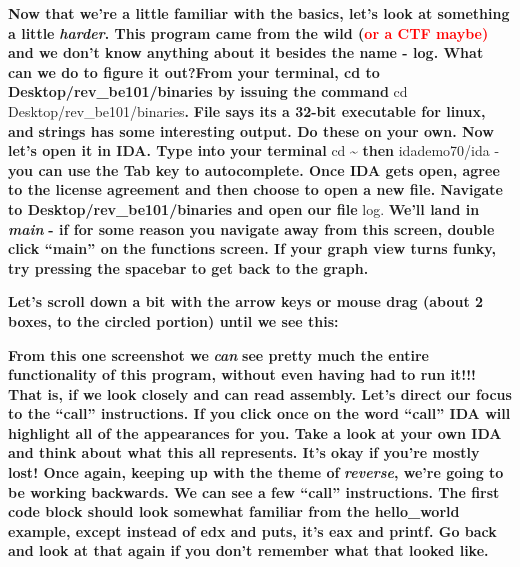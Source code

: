 \textbf{Now that we're a little familiar with the basics, let's look at something a little
}\textbf{\textit{harder}}\textbf{. This program came from the wild (}\textbf{\textcolor{red}{or a CTF maybe)}}\textbf{
and we don't know anything about it besides the name - log. What can we do to figure it out?From your terminal, cd to
Desktop/rev\_be101/binaries by issuing the command }cd Desktop/rev\_be101/binaries\textbf{.
}\textbf{\textcolor[rgb]{0.21960784,0.4627451,0.11372549}{File }}\textbf{says its a 32-bit executable for linux, and
}\textbf{\textcolor[rgb]{0.21960784,0.4627451,0.11372549}{strings }}\textbf{has some interesting output. Do these on
your own. \newline
\newline
Now let's open it in IDA. Type into your terminal }cd \~{} \textbf{then }idademo70/ida -\textbf{you can use the Tab key
to autocomplete. Once IDA gets open, agree to the license agreement and then choose to open a new file. Navigate to
Desktop/rev\_be101/binaries and open our file }log. \textbf{We'll land in }\textbf{\textit{main }}\textbf{ {}- if for
some reason you navigate away from this screen, double click ``main'' on the functions screen. If your graph view turns
funky, try pressing the spacebar to get back to the graph.}  
 

\textbf{Let's scroll down a bit with the arrow keys or mouse drag (about 2 boxes, to the circled portion) until we see
this:  }

  
 

\textbf{From this one screenshot we }\textbf{\textit{can}}\textbf{ see pretty much the entire functionality of this
program, without even having had to run it!!! That is, if we look closely and can read assembly. Let's direct our focus
to the ``call'' instructions. If you click once on the word ``call'' IDA will highlight all of the appearances for you.
Take a look at your own IDA and think about what this all represents. It's okay if you're mostly lost! Once again,
keeping up with the theme of }\textbf{\textit{reverse}}\textbf{, we're going to be working backwards. \newline
\newline
We can see a few ``call'' instructions. The first code block should look somewhat familiar from the hello\_world
example, except instead of edx and puts, it's eax and printf. Go back and look at that again if you don't remember what
that looked like.}

